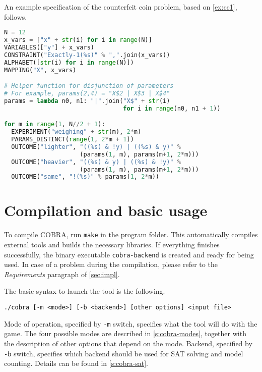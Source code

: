 \begin{example}
An example specification of the counterfeit coin problem,
based on \autoref{ex:cc1}, follows.
\begin{lstlisting}[language=Python]
N = 12
x_vars = ["x" + str(i) for i in range(N)]
VARIABLES(["y"] + x_vars)
CONSTRAINT("Exactly-1(%s)" % ",".join(x_vars))
ALPHABET([str(i) for i in range(N)])
MAPPING("X", x_vars)

# Helper function for disjunction of parameters
# For example, params(2,4) = "X$2 | X$3 | X$4"
params = lambda n0, n1: "|".join("X$" + str(i)
                                 for i in range(n0, n1 + 1))

for m in range(1, N//2 + 1):
  EXPERIMENT("weighing" + str(m), 2*m)
  PARAMS_DISTINCT(range(1, 2*m + 1))
  OUTCOME("lighter", "((%s) & !y) | ((%s) & y)" %
                     (params(1, m), params(m+1, 2*m)))
  OUTCOME("heavier", "((%s) & y) | ((%s) & !y)" %
                     (params(1, m), params(m+1, 2*m)))
  OUTCOME("same", "!(%s)" % params(1, 2*m))
\end{lstlisting}
\end{example}



\section{Compilation and basic usage}

To compile COBRA, run \texttt{make} in the program folder.
This automatically compiles external tools and builds the necessary libraries.
If everything finishes successfully,
  the binary executable \texttt{cobra-backend} is created
  and ready for being used.
In case of a problem during the compilation, please refer to the \emph{Requirements}
paragraph of \autoref{sec:impl}.

The basic syntax to launch the tool is the following.

\medskip
\centerline{\texttt{./cobra [-m <mode>] [-b <backend>] [other options] <input file>}}
\medskip

Mode of operation, specified by \texttt{-m} switch,
  specifies what the tool will do with the game.
The four possible modes are described in \autoref{s:cobra-modes},
  together with the description
  of other options that depend on the mode.
Backend, specified by \texttt{-b} switch, specifies which backend should be
  used for SAT solving and model counting.
Details can be found in \autoref{s:cobra-sat}.

